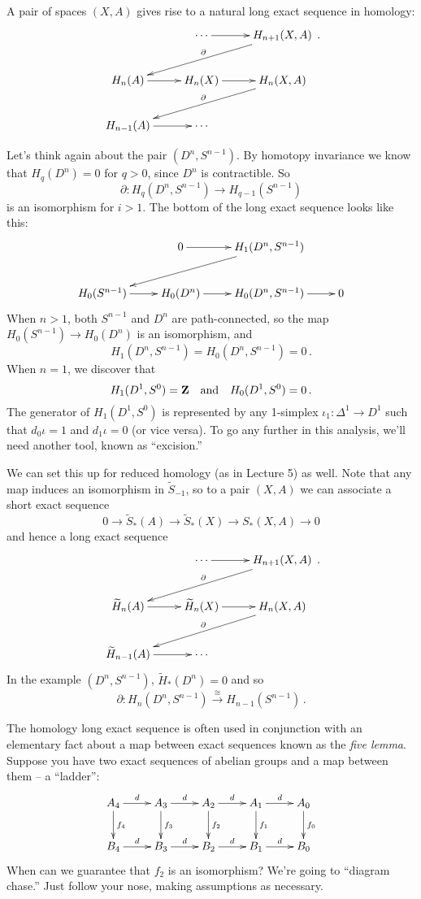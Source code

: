 \begin{example} A pair of spaces $(X,A)$ gives rise to a natural long exact 
sequence in homology:
\begin{equation*}
\xymatrix{ 
& \cdots \ar[r] & H_{n+1}(X,A) \ar[dll]_\partial\\
 H_n(A)\ar[r] & H_n(X)\ar[r] & H_n(X,A)\ar[dll]_\partial\\
 H_{n-1}(A)\ar[r] & \cdots & 
}\,.
\end{equation*}
\end{example}

\begin{example} Let's think again about the pair $(D^n,S^{n-1})$. By homotopy invariance we know that $H_q(D^n)=0$ for $q>0$, since $D^n$ is contractible. So 
\[
\partial:H_q(D^n,S^{n-1})\to H_{q-1}(S^{n-1})
\] 
is an isomorphism for $i>1$. The bottom of the long exact sequence looks like 
this: 
\[
\xymatrix{
& 0 \ar[r] & H_1(D^n,S^{n-1}) \ar[lld] \\
H_0(S^{n-1}) \ar[r] & H_0(D^n) \ar[r] & H_0(D^n,S^{n-1}) \ar[r] & 0
}\]
When $n>1$, both $S^{n-1}$ and $D^n$ are path-connected, so the map
$H_0(S^{n-1})\to H_0(D^n)$ is an isomorphism, and 
\[
H_1(D^n,S^{n-1})=H_0(D^n,S^{n-1})=0\,.
\]
When $n=1$, we discover that
\[
H_1(D^1,S^0)=\mathbf{Z} \quad\hbox{and}\quad H_0(D^1,S^0)=0\,.
\]
The generator of $H_1(D^1,S^0)$ is represented by any 1-simplex 
$\iota_1:\Delta^1\to D^1$ such that $d_0\iota=1$ and $d_1\iota=0$ (or vice 
versa). 
To go any further in this analysis, we'll need another tool, known as
``excision.'' 
\end{example}

We can set this up for reduced homology (as in Lecture 5) as well. 
Note that any map induces an isomorphism in $\widetilde S_{-1}$, so to
a pair $(X,A)$ we can associate a short exact sequence
\[
0\to\widetilde S_*(A)\to\widetilde S_*(X)\to S_*(X,A)\to0
\]
and hence a long exact sequence 
\begin{equation*}
\xymatrix{ 
& \cdots \ar[r] & H_{n+1}(X,A)\ar[dll]_\partial\\
\widetilde H_n(A)\ar[r] & \widetilde H_n(X)\ar[r] & H_n(X,A)\ar[dll]_\partial\\\widetilde H_{n-1}(A)\ar[r] & \cdots &
}\,.
\end{equation*}
In the example $(D^n,S^{n-1})$, $\widetilde H_*(D^n)=0$ and so 
\[
\partial:H_n(D^n,S^{n-1})\xrightarrow{\cong}H_{n-1}(S^{n-1})\,.
\]

The homology long exact sequence is often used in conjunction with 
an elementary fact about a map between exact sequences known as the 
{\em five lemma}.
Suppose you have two exact sequences of abelian groups and a map between them
-- a ``ladder'':
\begin{equation*}
\xymatrix{A_4\ar[r]^d\ar[d]^{f_4} & A_3\ar[r]^d\ar[d]^{f_3} & A_2\ar[r]^d\ar[d]^{f_2} & A_1\ar[r]^d\ar[d]^{f_1} & A_0\ar[d]^{f_0}\\
B_4\ar[r]^d & B_3\ar[r]^d & B_2\ar[r]^d & B_1\ar[r]^d & B_0}
\end{equation*}
When can we guarantee that $f_2$ is an isomorphism? We're going to ``diagram chase.'' Just follow your nose, making assumptions as necessary.

